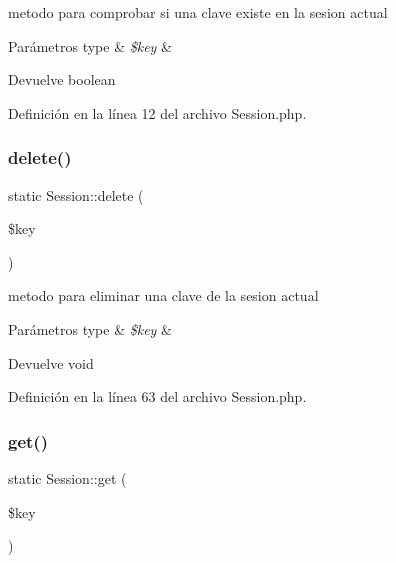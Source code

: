 metodo para comprobar si una clave existe en la sesion actual


\begin{DoxyParams}[1]{Parámetros}
type & {\em \$key} & \\
\hline
\end{DoxyParams}
\begin{DoxyReturn}{Devuelve}
boolean 
\end{DoxyReturn}


Definición en la línea 12 del archivo Session.\+php.

\mbox{\label{class_session_a1661dab5f97e1fb80ba16a1098a73649}} 
\subsubsection{\texorpdfstring{delete()}{delete()}}
{\footnotesize\ttfamily static Session\+::delete (\begin{DoxyParamCaption}\item[{}]{\$key }\end{DoxyParamCaption})\hspace{0.3cm}{\ttfamily [static]}}

metodo para eliminar una clave de la sesion actual


\begin{DoxyParams}[1]{Parámetros}
type & {\em \$key} & \\
\hline
\end{DoxyParams}
\begin{DoxyReturn}{Devuelve}
void 
\end{DoxyReturn}


Definición en la línea 63 del archivo Session.\+php.

\mbox{\label{class_session_a555ab9c7731c0103b16baf165e34efe8}} 
\subsubsection{\texorpdfstring{get()}{get()}}
{\footnotesize\ttfamily static Session\+::get (\begin{DoxyParamCaption}\item[{}]{\$key }\end{DoxyParamCaption})\hspace{0.3cm}{\ttfamily [static]}}


